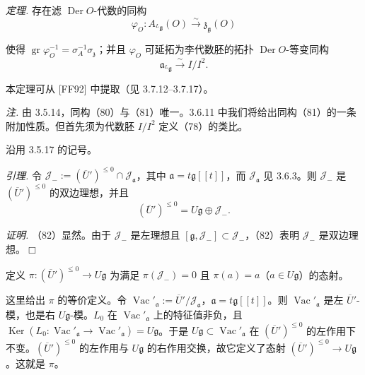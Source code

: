  \emph{定理.} 存在滤 $\operatorname{Der} O$-代数的同构
\begin{equation}\tag{80}
\varphi_{O}: A_{{}^{L}\mathfrak{g}}(O) \xrightarrow{\sim} \mathfrak{z}_{\mathfrak{g}}(O)
\end{equation}

使得 $\operatorname{gr}\varphi_{O}^{-1} = \sigma_{A}^{-1}\sigma_{\mathfrak{z}}$；并且 $\varphi_{O}$ 可延拓为李代数胚的拓扑 $\operatorname{Der} O$-等变同构
\begin{equation}\tag{81}
\mathfrak{a}_{{}^{L}\mathfrak{g}} \xrightarrow{\sim} I/I^{2}.
\end{equation}

本定理可从 [FF92] 中提取（见 3.7.12--3.7.17）。

\emph{注.} 由 3.5.14，同构（80）与（81）唯一。3.6.11 中我们将给出同构（81）的一条附加性质。但首先须为代数胚 $I/I^{2}$ 定义（78）的类比。

 沿用 3.5.17 的记号。

\emph{引理.} 令 $\mathcal{J}_{-} := (\overline{U}')^{\le 0} \cap \mathcal{J}_{\mathfrak{a}}$，其中 $\mathfrak{a} = t\mathfrak{g}[[t]]$，而 $\mathcal{J}_{\mathfrak{a}}$ 见 3.6.3。则 $\mathcal{J}_{-}$ 是 $(\overline{U}')^{\le 0}$ 的双边理想，并且
\begin{equation}\tag{82}
(\overline{U}')^{\le 0} = U\mathfrak{g} \oplus \mathcal{J}_{-}.
\end{equation}

\emph{证明.} （82）显然。由于 $\mathcal{J}_{-}$ 是左理想且 $[\mathfrak{g}, \mathcal{J}_{-}] \subset \mathcal{J}_{-}$，（82）表明 $\mathcal{J}_{-}$ 是双边理想。\hfill$\Box$

定义 $\pi: (\overline{U}')^{\le 0} \to U\mathfrak{g}$ 为满足 $\pi(\mathcal{J}_{-}) = 0$ 且 $\pi(a) = a$（$a \in U\mathfrak{g}$）的态射。

这里给出 $\pi$ 的等价定义。令 $\operatorname{Vac}'_{\mathfrak{a}} := \overline{U}'/\mathcal{J}_{\mathfrak{a}}$，$\mathfrak{a} = t\mathfrak{g}[[t]]$。则 $\operatorname{Vac}'_{\mathfrak{a}}$ 是左 $\overline{U}'$-模，也是右 $U\mathfrak{g}$-模。$L_{0}$ 在 $\operatorname{Vac}'_{\mathfrak{a}}$ 上的特征值非负，且 $\operatorname{Ker}(L_{0}: \operatorname{Vac}'_{\mathfrak{a}} \to \operatorname{Vac}'_{\mathfrak{a}}) = U\mathfrak{g}$。于是 $U\mathfrak{g} \subset \operatorname{Vac}'_{\mathfrak{a}}$ 在 $(\overline{U}')^{\le 0}$ 的左作用下不变。$(\overline{U}')^{\le 0}$ 的左作用与 $U\mathfrak{g}$ 的右作用交换，故它定义了态射 $(\overline{U}')^{\le 0} \to U\mathfrak{g}$。这就是 $\pi$。

